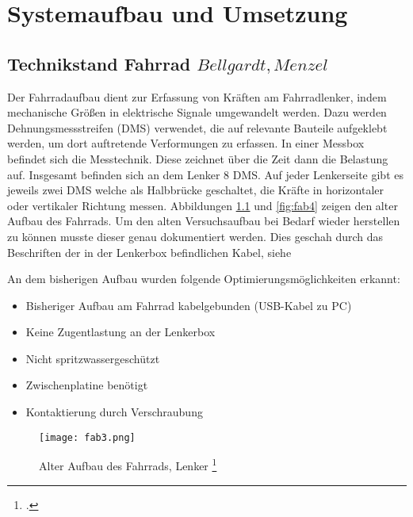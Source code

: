 \chapter{Systemaufbau und Umsetzung}

\section{Technikstand Fahrrad \(Bellgardt, Menzel\)}
Der Fahrradaufbau dient zur Erfassung von Kräften am Fahrradlenker, indem mechanische Größen in elektrische Signale umgewandelt werden. Dazu werden Dehnungsmessstreifen (DMS) verwendet, die auf relevante Bauteile aufgeklebt werden, um dort auftretende Verformungen zu erfassen. In einer Messbox befindet sich die Messtechnik. Diese zeichnet über die Zeit dann die Belastung auf. Insgesamt befinden sich an dem Lenker 8 DMS. Auf jeder Lenkerseite gibt es jeweils zwei DMS welche als Halbbrücke geschaltet, die Kräfte in horizontaler oder vertikaler Richtung messen. 
Abbildungen \ref{fig:fab3} und \ref{fig:fab4} zeigen den alter Aufbau des Fahrrads.
Um den alten Versuchsaufbau bei Bedarf wieder herstellen zu können musste dieser genau dokumentiert werden.
Dies geschah durch das Beschriften der in der Lenkerbox befindlichen Kabel, siehe 


An dem bisherigen Aufbau wurden folgende Optimierungsmöglichkeiten erkannt:
\begin{itemize}
    \item Bisheriger Aufbau am Fahrrad kabelgebunden (USB-Kabel zu PC)
    \item Keine Zugentlastung an der Lenkerbox
    \item Nicht spritzwassergeschützt
    \item Zwischenplatine benötigt
    \item Kontaktierung durch Verschraubung
\end{itemize}

\begin{figure}[h]
    \begin{center}
        \texttt{[image: fab3.png]}
        \caption[Alter Aufbau des Fahrrads, Lenker (Abbildungsverzeichnis)]{Alter Aufbau des Fahrrads, Lenker
        \footcite{Rechter Teil des Bildes: Praktikum Schwingbruchgefaehrdete Bauteile sicher dimensionieren und betreiben
        }
        }
        \label{fig:fab3}
    \end{center}
\end{figure}



